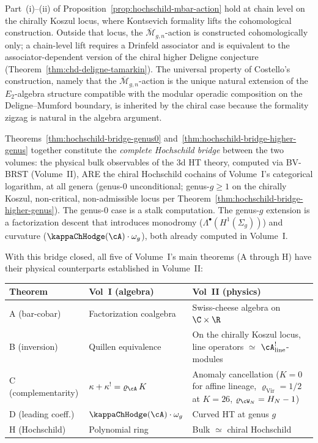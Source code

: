 \begin{remark}
\label{rem:hochschild-mbar-scope}
Part~(i)--(ii) of
Proposition~\textup{\ref{prop:hochschild-mbar-action}} hold at chain
level on the chirally Koszul locus, where Kontsevich formality lifts
the cohomological construction. Outside that locus, the
$\overline{\mathcal{M}}_{g,n}$-action is constructed cohomologically
only; a chain-level lift requires a Drinfeld associator and is
equivalent to the associator-dependent version of the chiral
higher Deligne conjecture
(Theorem~\textup{\ref{thm:chd-deligne-tamarkin}}). The universal
property of Costello's construction, namely that the
$\overline{\mathcal{M}}_{g,n}$-action is the unique natural
extension of the $E_2$-algebra structure compatible with the modular
operadic composition on the Deligne--Mumford boundary, is inherited
by the chiral case because the formality zigzag is natural in the
algebra argument.
\end{remark}

\begin{remark}
Theorems~\ref{thm:hochschild-bridge-genus0}
and~\ref{thm:hochschild-bridge-higher-genus} together constitute
the \emph{complete Hochschild bridge} between the two volumes:
the physical bulk observables of the 3d HT theory, computed via
BV-BRST (Volume~II), ARE the chiral Hochschild cochains of
Volume~I's categorical logarithm, at all genera (genus-$0$
unconditional; genus-$g\geq 1$ on the chirally Koszul, non-critical,
non-admissible locus per
Theorem~\ref{thm:hochschild-bridge-higher-genus}). The genus-$0$
case is a stalk computation. The genus-$g$ extension is a
factorization descent that introduces monodromy
($\Lambda^\bullet(H^1(\Sigma_g))$) and curvature
($\kappaChHodge(\cA) \cdot \omega_g$), both already computed in
Volume~I.

With this bridge closed, all five of Volume~I's main theorems
(A through H) have their physical counterparts established in
Volume~II:
\begin{center}
\renewcommand{\arraystretch}{1.2}
\begin{tabular}{lll}
\textbf{Theorem} & \textbf{Vol~I (algebra)} &
 \textbf{Vol~II (physics)} \\
\hline
A (bar-cobar) & Factorization coalgebra &
 Swiss-cheese algebra on $\C \times \R$ \\
B (inversion) & Quillen equivalence &
 On the chirally Koszul locus, line operators $\simeq$
 $\cA^!_{\mathrm{line}}$-modules \\
C (complementarity) & $\kappa + \kappa^! = \varrho_{\cA}\,K$ &
 Anomaly cancellation ($K = 0$ for affine lineage,
 $\varrho_{\mathrm{Vir}} = 1/2$ at $K = 26$,
 $\varrho_{\cW_N} = H_N - 1$) \\
D (leading coeff.) & $\kappaChHodge(\cA) \cdot \omega_g$ &
 Curved HT at genus $g$ \\
H (Hochschild) & Polynomial ring &
 Bulk $\simeq$ chiral Hochschild
\end{tabular}
\end{center}
\end{remark}


